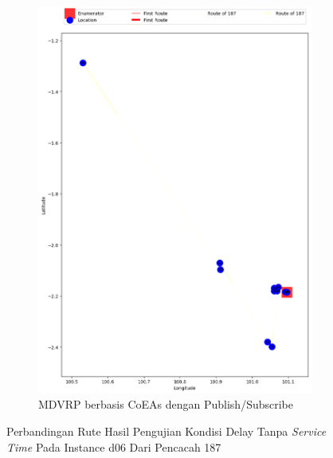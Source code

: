\begin{figure}[H]\ContinuedFloat
	\centering
	\begin{subfigure}[t]{\textwidth}
		\centering
		\includegraphics[width=\textwidth]{Resources/Images/delayed_6/real_m15_n100_delayed_6_187_pubsub_coes}
		\caption{MDVRP berbasis CoEAs dengan Publish/Subscribe}
		\label{fig:real_m15_n100_delayed_6_187_pubsub_coes}
	\end{subfigure}
	\caption{Perbandingan Rute Hasil Pengujian Kondisi Delay Tanpa \textit{Service Time} Pada Instance d06 Dari Pencacah 187}
	\label{fig:real_m15_n100_delayed_6_187_contd}
\end{figure}


